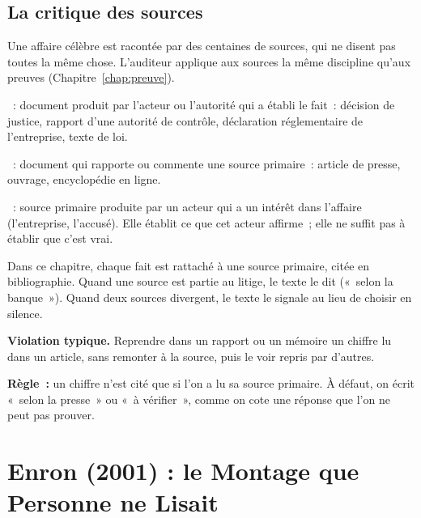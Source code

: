 \subsection{La critique des sources}

Une affaire célèbre est racontée par des centaines de sources, qui ne
disent pas toutes la même chose. L'auditeur applique aux sources la même
discipline qu'aux preuves (Chapitre~\ref{chap:preuve}).

\begin{boxdef}
~: document produit par
l'acteur ou l'autorité qui a établi le fait~: décision de justice, rapport
d'une autorité de contrôle, déclaration réglementaire de l'entreprise,
texte de loi.

\medskip
{}~: document qui
rapporte ou commente une source primaire~: article de presse, ouvrage,
encyclopédie en ligne.

\medskip
{}~: source primaire produite par
un acteur qui a un intérêt dans l'affaire (l'entreprise, l'accusé). Elle
établit ce que cet acteur affirme~; elle ne suffit pas à établir que c'est
vrai.
\end{boxdef}

Dans ce chapitre, chaque fait est rattaché à une source primaire, citée en
bibliographie. Quand une source est partie au litige, le texte le dit
(«~selon la banque~»). Quand deux sources divergent, le texte le signale au
lieu de choisir en silence.

\begin{boxalert}
\textbf{Violation typique.} Reprendre dans un rapport ou un mémoire un
chiffre lu dans un article, sans remonter à la source, puis le voir repris
par d'autres.

\smallskip
\textbf{Règle~:} un chiffre n'est cité que si l'on a lu sa source
primaire. À défaut, on écrit «~selon la presse~» ou «~à vérifier~», comme
on cote \NEK{} une réponse que l'on ne peut pas prouver.
\end{boxalert}

\section{Enron (2001) : le Montage que Personne ne Lisait}
\label{sec:c02-enron}

